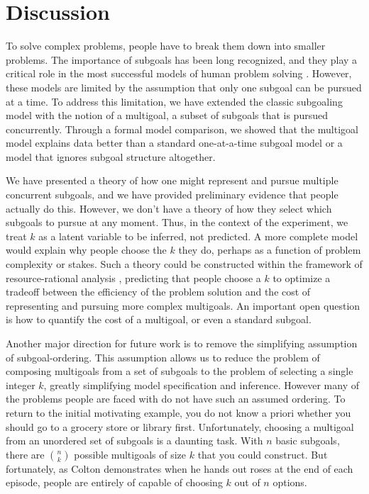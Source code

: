 \documentclass[10pt,letterpaper]{article}
\begin{document}

\section{Discussion}
  
To solve complex problems, people have to break them down into smaller problems. The importance of subgoals has been long recognized, and they play a critical role in the most successful models of human problem solving \citep{anderson2013architecture,NewellSimon1972,laird1987soar}. However, these models are limited by the assumption that only one subgoal can be pursued at a time. To address this limitation, we have extended the classic subgoaling model with the notion of a multigoal, a subset of subgoals that is pursued concurrently. Through a formal model comparison, we showed that the multigoal model explains data better than a standard one-at-a-time subgoal model or a model that ignores subgoal structure altogether.

We have presented a theory of how one might represent and pursue multiple concurrent subgoals, and we have provided preliminary evidence that people actually do this. However, we don't have a theory of how they select which subgoals to pursue at any moment. Thus, in the context of the experiment, we treat $k$ as a latent variable to be inferred, not predicted. A more complete model would explain why people choose the $k$ they do, perhaps as a function of problem complexity or stakes. Such a theory could be constructed within the framework of resource-rational analysis \citep{Griffiths2014}, predicting that people choose a $k$ to optimize a tradeoff between the efficiency of the problem solution and the cost of representing and pursuing more complex multigoals. An important open question is how to quantify the cost of a multigoal, or even a standard subgoal.

Another major direction for future work is to remove the simplifying assumption of subgoal-ordering. This assumption allows us to reduce the problem of composing multigoals from a set of subgoals to the problem of selecting a single integer $k$, greatly simplifying model specification and inference. However many of the problems people are faced with do not have such an assumed ordering. To return to the initial motivating example, you do not know a priori whether you should go to a grocery store or library first. Unfortunately, choosing a multigoal from an unordered set of subgoals is a daunting task. With $n$ basic subgoals, there are $\binom{n}{k}$ possible multigoals of size $k$ that you could construct. But fortunately, as Colton demonstrates when he hands out roses at the end of each episode, people are entirely of capable of choosing $k$ out of $n$ options.
\end{document}
